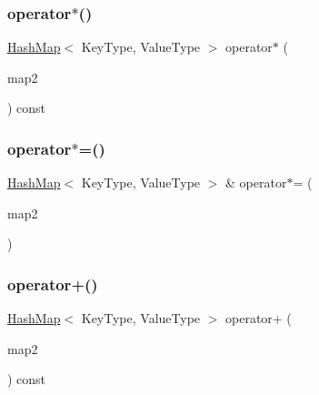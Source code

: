 \mbox{\label{classHashMap_a8336e7e5cf4882484f71f7b9d21874c3}} 
\subsubsection{\texorpdfstring{operator$\ast$()}{operator*()}}
{\footnotesize\ttfamily \mbox{\hyperlink{classHashMap}{Hash\+Map}}$<$ Key\+Type, Value\+Type $>$ operator$\ast$ (\begin{DoxyParamCaption}\item[{const \mbox{\hyperlink{classHashMap}{Hash\+Map}}$<$ Key\+Type, Value\+Type $>$ \&}]{map2 }\end{DoxyParamCaption}) const}

\mbox{\label{classHashMap_aeeef62e8c38083e34f8a611816f9d767}} 
\subsubsection{\texorpdfstring{operator$\ast$=()}{operator*=()}}
{\footnotesize\ttfamily \mbox{\hyperlink{classHashMap}{Hash\+Map}}$<$ Key\+Type, Value\+Type $>$ \& operator$\ast$= (\begin{DoxyParamCaption}\item[{const \mbox{\hyperlink{classHashMap}{Hash\+Map}}$<$ Key\+Type, Value\+Type $>$ \&}]{map2 }\end{DoxyParamCaption})}

\mbox{\label{classHashMap_afba7f384a875018877c06fa71f6e7b5e}} 
\subsubsection{\texorpdfstring{operator+()}{operator+()}}
{\footnotesize\ttfamily \mbox{\hyperlink{classHashMap}{Hash\+Map}}$<$ Key\+Type, Value\+Type $>$ operator+ (\begin{DoxyParamCaption}\item[{const \mbox{\hyperlink{classHashMap}{Hash\+Map}}$<$ Key\+Type, Value\+Type $>$ \&}]{map2 }\end{DoxyParamCaption}) const}

